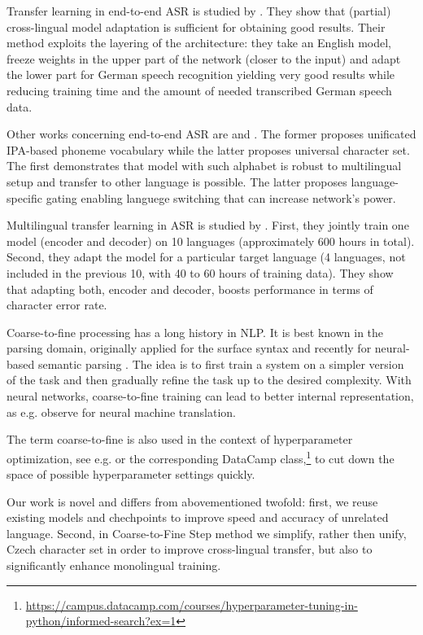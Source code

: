 Transfer learning in end-to-end ASR is studied by  . They show that (partial) cross-lingual model adaptation is sufficient for obtaining good results. Their method exploits the layering of the architecture: they take an English model, freeze weights in the upper part of the network (closer to the input) and adapt the lower part for German speech recognition yielding very good results while reducing training time and the amount of needed transcribed German speech data.

Other works concerning end-to-end ASR are  and . The former proposes unificated IPA-based phoneme vocabulary while the latter proposes universal character set. The first demonstrates that model with such alphabet is robust to multilingual setup and transfer to other language is possible. The latter proposes language-specific gating enabling languege switching that can increase network's power.

Multilingual transfer learning in ASR is studied by . First, they jointly train one model (encoder and decoder) on 10 languages (approximately 600 hours in total). Second, they adapt the model %
for a particular target language (4 languages, not included in the previous 10, with 40 to 60 hours of training data). They show that adapting both, encoder and decoder, boosts performance in terms of character error rate.

Coarse-to-fine processing  has a long history in NLP. It is best known in the parsing domain, originally applied for the surface syntax  and recently for neural-based semantic parsing . The idea is to first train a system on a simpler version of the task and then gradually refine the task up to the desired complexity. With neural networks, coarse-to-fine training can lead to better internal representation, as e.g.  observe for neural machine translation.

The term coarse-to-fine is also used in the context of hyperparameter optimization, see e.g.  or the corresponding DataCamp class,\footnote{\url{https://campus.datacamp.com/courses/hyperparameter-tuning-in-python/informed-search?ex=1}} to cut down the space of possible hyperparameter settings quickly.

Our work is novel and differs from abovementioned twofold: first, we reuse existing models and chechpoints to improve speed and accuracy of unrelated language. Second, in Coarse-to-Fine Step method we simplify, rather then unify, Czech character set in order to improve cross-lingual transfer, but also to significantly enhance monolingual training.


